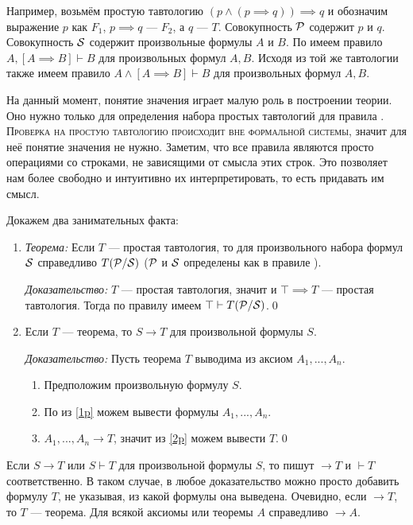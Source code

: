 Например, возьмём простую тавтологию $(p\land (p\implies q))\implies q$
и обозначим выражение $p$ как $F_1$, $p\implies q$ --- $F_2$,
а $q$ --- $T$.
Совокупность $\mathcal P$ содержит $p$ и $q$.
Совокупность $\mathcal S$ содержит произвольные формулы $A$ и $B$.
По \taut{} имеем правило ${A,[A\implies B]\vdash B}$
для произвольных формул $A,B$.
Исходя из той же тавтологии также имеем правило
${A\land[A\implies B]\vdash B}$
для произвольных формул $A,B$.

На данный момент, понятие значения играет малую роль в построении теории.
Оно нужно только для определения набора простых тавтологий для правила \taut{}.
\textsc{Проверка на простую тавтологию
	происходит вне формальной системы}, значит для неё понятие значения не нужно.
Заметим, что все правила являются просто операциями со строками, не зависящими от смысла
этих строк. Это позволяет нам более свободно и интуитивно их интерпретировать, то
есть придавать им смысл.

Докажем два занимательных факта:
\begin{enumerate}
	\item{}
	      {\it Теорема:}
	Если $T$ --- простая тавтология, то
	для произвольного набора формул $\mathcal S$ справедливо $T(\mathcal P/\mathcal S)$
	($\mathcal P$ и $\mathcal S$ определены как в правиле \taut{}).

		{\it Доказательство:}
	$T$ --- простая тавтология, значит и
	${\top\implies T}$ --- простая тавтология. Тогда по правилу \taut{} имеем
	$\top\vdash T(\mathcal P/\mathcal S)$.\qed

	\item{}Если $T$ --- теорема, то $S\to T$ для произвольной формулы $S$.

		{\it Доказательство:}
	Пусть теорема $T$ выводима из аксиом $A_1,...,A_{n}$.
	\begin{enumerate}[label=(\roman*)]
		\item{}\label{1p}Предположим произвольную формулу $S$.
		\item{}\label{2p}По \axiom{} из \ref{1p} можем вывести
		формулы $A_1,...,A_{n}$.
		\item{}\label{3p}$A_1,...,A_{n}\to T$, значит из \ref{2p} можем вывести $T$.\qed
	\end{enumerate}
\end{enumerate}

Если $S\to T$ или $S\vdash T$ для произвольной формулы $S$,
то пишут $\to T$ и $\vdash T$ соответственно. В таком случае,
в любое доказательство можно просто добавить формулу $T$,
не указывая, из какой формулы она выведена. Очевидно,
если $\to T$, то $T$ --- теорема. Для всякой аксиомы или теоремы $A$
справедливо $\to A$.

